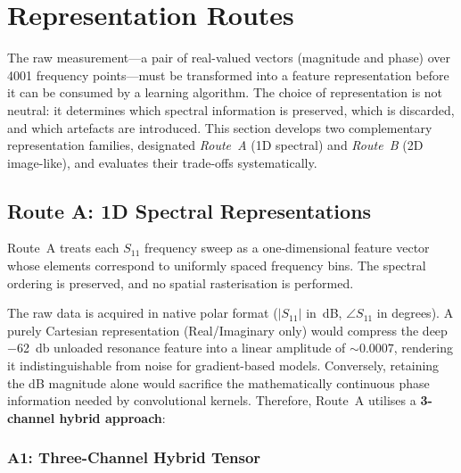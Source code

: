 
\section{Representation Routes}
\label{sec:repr}

The raw measurement—a pair of real-valued vectors (magnitude and phase)
over \num{4001} frequency points—must be transformed into a feature
representation before it can be consumed by a learning algorithm.  The
choice of representation is not neutral: it determines which spectral
information is preserved, which is discarded, and which artefacts are
introduced.  This section develops two complementary representation
families, designated \emph{Route~A} (1D spectral) and \emph{Route~B}
(2D image-like), and evaluates their trade-offs systematically.

\subsection{Route A: 1D Spectral Representations}
\label{sec:repr:routeA}

Route~A treats each $S_{11}$ frequency sweep as a one-dimensional
feature vector whose elements correspond to uniformly spaced frequency
bins.  The spectral ordering is preserved, and no spatial rasterisation
is performed.

The raw data is acquired in native polar format ($|S_{11}|$ in~dB,
$\angle S_{11}$ in degrees).  A purely Cartesian representation
(Real/Imaginary only) would compress the deep \SI{-62}{\decibel}
unloaded resonance feature into a linear amplitude of
$\sim 0.0007$, rendering it indistinguishable from noise for
gradient-based models.  Conversely, retaining the dB magnitude alone
would sacrifice the mathematically continuous phase information needed
by convolutional kernels.  Therefore, Route~A utilises a
\textbf{3-channel hybrid approach}:

\subsubsection{A1: Three-Channel Hybrid Tensor}
\label{sec:repr:routeA:hybrid}

